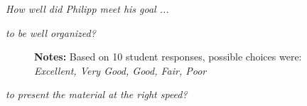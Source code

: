 \begin{boenumerate}
\item \textit{How well did Philipp meet his goal ...}
\begin{itemize}
\item \textit{to be well organized?}

\begin{figure}[h!]\centering
{}\hspace{0.75cm}
\begin{center}
\begin{minipage}[t]{0.85\columnwidth}\vspace{-0.75cm}
\item\scriptsize{\textbf{Notes:} Based on 10 student responses, possible choices were: \emph{Excellent, Very Good, Good, Fair, Poor} }
\end{minipage}
\end{center}
\end{figure}

\item \textit{to present the material at the right speed?}


\end{itemize}
\end{boenumerate}

